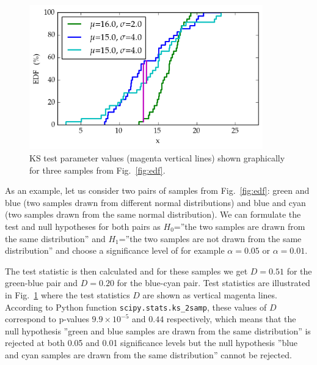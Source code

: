 \documentclass[english, oneside]{HYgradu}
\begin{document}
\begin{figure}
   \centering
   \includegraphics[width=0.9\textwidth]{kuvat/kstest.png}
   \caption{KS test parameter values (magenta vertical lines) shown graphically for three samples from Fig.\ \ref{fig:edf}.}
   \label{fig:ks} 
\end{figure}

As an example, let us consider two pairs of samples from Fig.\ \ref{fig:edf}: green and blue (two samples drawn from different normal distributions) and blue and cyan (two samples drawn from the same normal distribution). We can formulate the test and null hypotheses for both pairs as $H_0$=''the two samples are drawn from the same distribution'' and $H_1$=''the two samples are not drawn from the same distribution'' and choose a significance level of for example $\alpha=0.05$ or $\alpha=0.01$.

The test statistic is then calculated and for these samples we get $D=0.51$ for the green-blue pair and $D=0.20$ for the blue-cyan pair. Test statistics are illustrated in Fig.\ \ref{fig:ks} where the test statistics $D$ are shown as vertical magenta lines. According to Python function \texttt{scipy.stats.ks\_2samp}, these values of $D$ correspond to p-values $9.9\times 10^{-5}$ and $0.44$ respectively, which means that the null hypothesis ''green and blue samples are drawn from the same distribution'' is rejected at both 0.05 and 0.01 significance levels but the null hypothesis ''blue and cyan samples are drawn from the same distribution'' cannot be rejected.
\end{document}
